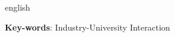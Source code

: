 \setlength{\absparsep}{18pt} %
\begin{resumo}[Abstract]
 \begin{otherlanguage*}{english}

   \vspace{\onelineskip}
 
   \noindent 
   \textbf{Key-words}: Industry-University Interaction
 \end{otherlanguage*}
\end{resumo}
